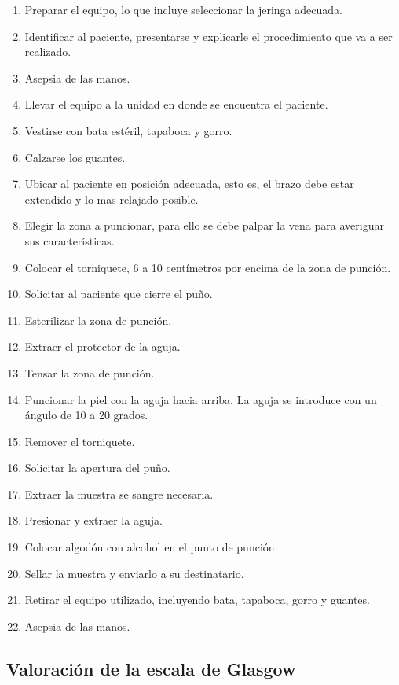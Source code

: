 \begin{enumerate}
\item Preparar el equipo, lo que incluye seleccionar la jeringa adecuada.
\item Identificar al paciente, presentarse y explicarle el procedimiento que va
    a ser realizado.
\item Asepsia de las manos.
\item Llevar el equipo a la unidad en donde se encuentra el paciente.
\item Vestirse con bata estéril, tapaboca y gorro.
\item Calzarse los guantes.
\item Ubicar al paciente en posición adecuada, esto es, el brazo debe estar
    extendido y lo mas relajado posible.
\item Elegir la zona a puncionar, para ello se debe palpar la vena para
    averiguar sus características.
\item Colocar el torniquete, 6 a 10 centímetros por encima de la zona de
    punción.
\item Solicitar al paciente que cierre el puño.
\item Esterilizar la zona de punción.
\item Extraer el protector de la aguja.
\item Tensar la zona de punción.
\item Puncionar la piel con la aguja hacia arriba. La aguja se introduce con un
    ángulo de 10 a 20 grados.
\item Remover el torniquete.
\item Solicitar la apertura del puño.
\item Extraer la muestra se sangre necesaria.
\item Presionar y extraer la aguja.
\item Colocar algodón con alcohol en el punto de punción.
\item Sellar la muestra y enviarlo a su destinatario.
\item Retirar el equipo utilizado, incluyendo bata, tapaboca, gorro y guantes.
\item Asepsia de las manos.
\end{enumerate}


\subsection{Valoración de la escala de Glasgow}
\label{sec:glasgow}


